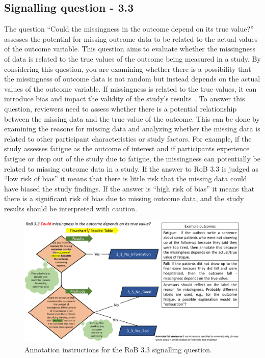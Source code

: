 \documentclass[sn-mathphys,Numbered]{sn-jnl}%
\begin{document}
\subsection*{Signalling question - 3.3 }
\label{subsec:3_3}
%
The question ``Could the missingness in the outcome depend on its true value?'' assesses the potential for missing outcome data to be related to the actual values of the outcome variable.
This question aims to evaluate whether the missingness of data is related to the true values of the outcome being measured in a study.
By considering this question, you are examining whether there is a possibility that the missingness of outcome data is not random but instead depends on the actual values of the outcome variable.
If missingness is related to the true values, it can introduce bias and impact the validity of the study's results~\cite{bell2014handling,calvert2013reporting}.
To answer this question, reviewers need to assess whether there is a potential relationship between the missing data and the true value of the outcome.
This can be done by examining the reasons for missing data and analyzing whether the missing data is related to other participant characteristics or study factors.
For example, if the study assesses fatigue as the outcome of interest and if participants experience fatigue or drop out of the study due to fatigue, the missingness can potentially be related to missing outcome data in a study.
If the answer to RoB 3.3 is judged as ``low risk of bias'' it means that there is little risk that the missing data could have biased the study findings.
If the answer is ``high risk of bias'' it means that there is a significant risk of bias due to missing outcome data, and the study results should be interpreted with caution.


%
%
%
\begin{figure}[hbt]
    \centering
    \includegraphics[width=\textwidth]{figures/3_3.pdf}
    \caption{Annotation instructions for the RoB 3.3 signalling question.}
    \label{fig:3_3}
\end{figure}
%
\end{document}
